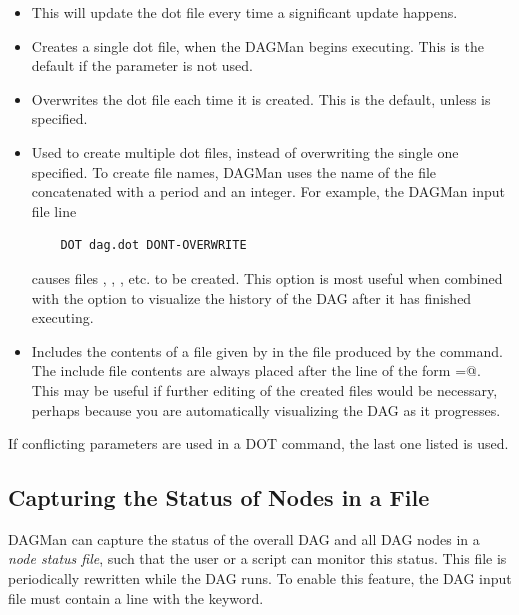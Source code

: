 \begin{itemize}

\item {}  This will update the dot file every time a
significant update happens. 

\item {} Creates a single dot file, when
the DAGMan begins executing. This is the default if the parameter
 is not used.

\item {} Overwrites the dot file each time it
is created. This is the default, unless 
is specified.

\item {} Used to create multiple dot files, instead
of overwriting the single one specified.
To create file names,
DAGMan uses the name of the file concatenated with a period and an
integer. For example, the DAGMan input file line
\begin{verbatim}
    DOT dag.dot DONT-OVERWRITE
\end{verbatim}
causes files
,
,
,
etc. to be created.
This option is
most useful when combined with the  option to
visualize the history of the DAG after it has finished executing. 

\item {} Includes the contents
of a file given by  in the file produced by the
 command.
The include file contents are always placed after the line of
the form
\verb@label=@.
This may be useful if further editing of the created files would
be necessary,
perhaps because you are automatically visualizing the DAG as it
progresses. 

\end{itemize}

If conflicting parameters are used in a DOT command, the last one
listed is used.

\subsection{\label{sec:DAG-node-status}Capturing the Status of Nodes in a File}

DAGMan can capture the status of the overall DAG and all DAG nodes
in a \emph{node status file},
such that the user or a script can monitor this status.
This file is periodically rewritten
while the DAG runs.
To enable this feature, the DAG input file must contain a line with the
 keyword.

